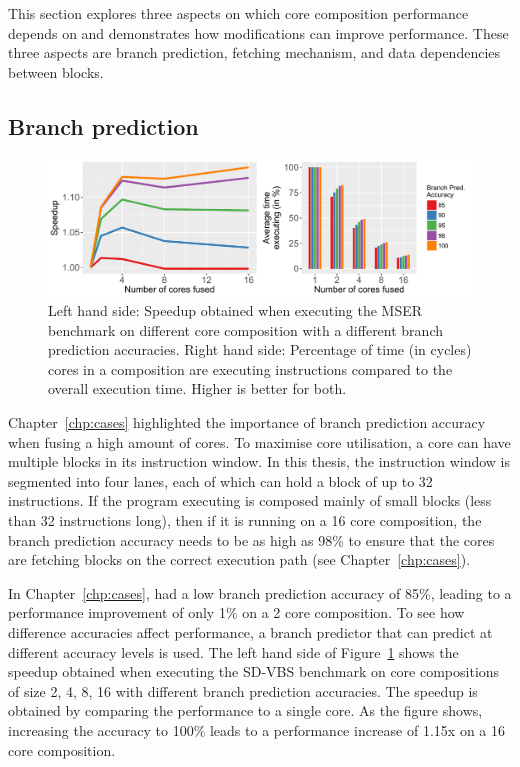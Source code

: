 This section explores three aspects on which core composition performance depends on and demonstrates how modifications can improve performance.
These three aspects are branch prediction, fetching mechanism, and data dependencies between blocks.

\subsection{Branch prediction}
\begin{figure}[t]
    \centering
    \includegraphics[width=1\textwidth]{chapter3/graphics/motiv_p1.pdf}
    \caption{Left hand side: Speedup obtained when executing the MSER benchmark on different core composition with a different branch prediction accuracies.
	Right hand side: Percentage of time (in cycles) cores in a composition are executing instructions compared to the overall execution time. Higher is better for both.}
    \label{fig:mser_motiv}
	\vspace{1em}
\end{figure}
Chapter~\ref{chp:cases} highlighted the importance of branch prediction accuracy when fusing a high amount of cores.
To maximise core utilisation, a core can have multiple blocks in its instruction window.
In this thesis, the instruction window is segmented into four lanes, each of which can hold a block of up to 32 instructions.
If the program executing is composed mainly of small blocks (less than 32 instructions long), then if it is running on a 16 core composition, the branch prediction accuracy needs to be as high as 98\% to ensure that the cores are fetching blocks on the correct execution path (see Chapter~\ref{chp:cases}).

In Chapter~\ref{chp:cases},  had a low branch prediction accuracy of 85\%, leading to a performance improvement of only 1\% on a 2 core composition.
To see how difference accuracies affect performance, a branch predictor that can predict at different accuracy levels is used.
The left hand side of Figure~\ref{fig:mser_motiv} shows the speedup obtained when executing the SD-VBS benchmark  on core compositions of size 2, 4, 8, 16 with different branch prediction accuracies.
The speedup is obtained by comparing the performance to a single core.
As the figure shows, increasing the accuracy to 100\% leads to a performance increase of 1.15x on a 16 core composition.

